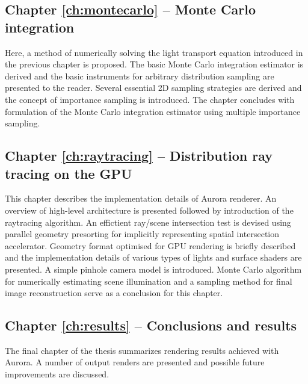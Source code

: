 \subsection{Chapter \ref{ch:montecarlo} -- Monte Carlo integration}
Here, a method of numerically solving the light transport equation introduced in the previous chapter is proposed. The basic Monte Carlo integration estimator is derived and the basic instruments for arbitrary distribution sampling are presented to the reader. Several essential 2D sampling strategies are derived and the concept of importance sampling is introduced. The chapter concludes with formulation of the Monte Carlo integration estimator using multiple importance sampling.

\subsection{Chapter \ref{ch:raytracing} -- Distribution ray tracing on the GPU}
This chapter describes the implementation details of Aurora renderer. An overview of high-level architecture is presented followed by introduction of the raytracing algorithm. An effictient ray/scene intersection test is devised using parallel geometry presorting for implicitly representing spatial intersection accelerator. Geometry format optimised for GPU rendering is briefly described and the implementation details of various types of lights and surface shaders are presented. A simple pinhole camera model is introduced. Monte Carlo algorithm for numerically estimating scene illumination and a sampling method for final image reconstruction serve as a conclusion for this chapter.

\subsection{Chapter \ref{ch:results} -- Conclusions and results}
The final chapter of the thesis summarizes rendering results achieved with Aurora. A number of output renders are presented and possible future improvements are discussed.



